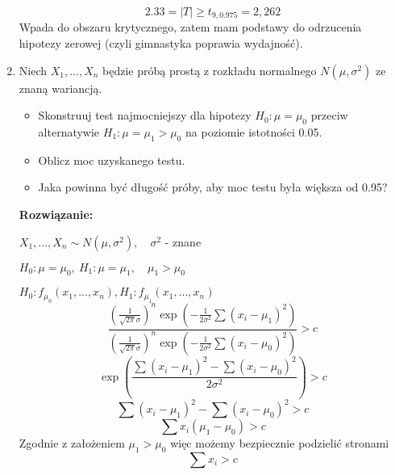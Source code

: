 \documentclass[11pt]{article}
\begin{document}
\begin{enumerate}
    \[ 2.33 =|T| \geq t_{9, 0.975} = 2,262\]
    Wpada do obszaru krytycznego, zatem mam podstawy do odrzucenia hipotezy zerowej (czyli gimnastyka poprawia wydajność). 
    \item Niech \(X_1, ..., X_n\) będzie próbą prostą z rozkładu normalnego \(N(\mu, \sigma^2)\) ze znaną wariancją. 
    \begin{itemize}
        \item Skonstruuj test najmocniejszy dla hipotezy \(H_0: \mu = \mu_0\) przeciw alternatywie \(H_1: \mu = \mu_1 > \mu_0\) na poziomie istotności 0.05.
        \item  Oblicz moc uzyskanego testu.
        \item Jaka powinna być długość próby, aby moc testu była większa od 0.95?
    \end{itemize}
    \textbf{Rozwiązanie: }
    \par 
    \(X_1, ..., X_n \sim N(\mu, \sigma^2), \quad \sigma^2\) - znane
    \par 
    \(H_0: \mu = \mu_0, \: H_1: \mu = \mu_1, \quad \mu_1> \mu_0\)
    \par 
    \(H_0: f_{\mu_0}(x_1,..., x_n), H_1: f_{\mu_1}(x_1,..., x_n)\)
    \[\frac{\left(\frac{1}{\sqrt{2\pi} \sigma}\right)^n \exp\left(- \frac{1}{2 \sigma^2} \sum (x_i - \mu_1)^2 \right) }{\left(\frac{1}{\sqrt{2\pi} \sigma}\right)^n \exp\left(- \frac{1}{2 \sigma^2} \sum (x_i - \mu_0)^2 \right) } > c
    \]
    \[\exp\left(\frac{\sum(x_i - \mu_1)^2 - \sum(x_i - \mu_0)^2  }{2\sigma^2} \right) > c\]
    \[\sum(x_i - \mu_1)^2 - \sum(x_i - \mu_0)^2 > c\]
    \[\sum x_i (\mu_1 - \mu_0) > c\]
    Zgodnie z założeniem \(\mu_1 > \mu_0\) więc możemy bezpiecznie podzielić stronami
    \[\sum x_i > c\]
    

\end{enumerate}
\end{document}
